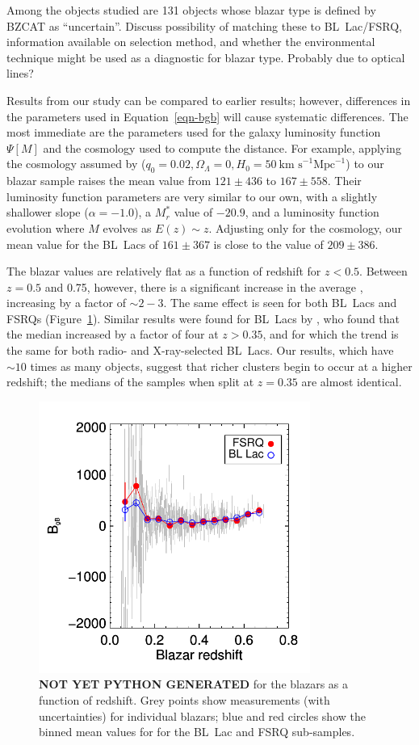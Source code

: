 \documentclass{emulateapj}
\begin{document}
Among the objects studied are 131 objects whose blazar type is defined by BZCAT as ``uncertain''. Discuss possibility of matching these to BL~Lac/FSRQ, information available on selection method, and whether the environmental technique might be used as a diagnostic for blazar type. Probably due to optical lines?

Results from our study can be compared to earlier results; however, differences in the parameters used in Equation~\ref{eqn-bgb} will cause systematic differences. The most immediate are the parameters used for the galaxy luminosity function $\Psi[M]$ and the cosmology used to compute the distance. For example, applying the cosmology assumed by \citet{wur97} ($q_0=0.02, \Omega_\Lambda=0, H_0=50~\mbox{km s}^{-1}\mbox{Mpc}^{-1}$) to our blazar sample raises the mean \bgb{} value from $121\pm436$ to $167\pm558$. Their luminosity function parameters are very similar to our own, with a slightly shallower slope ($\alpha=-1.0$), a $M_r^*$ value of $-20.9$, and a luminosity function evolution where $M$ evolves as $E(z)\sim z$. Adjusting only for the cosmology, our mean value for the BL~Lacs of $161\pm367$ is close to the \citet{wur97} value of $209\pm386$. 

The blazar \bgb{} values are relatively flat as a function of redshift for $z<0.5$. Between $z=0.5$ and 0.75, however, there is a significant increase in the average \bgb, increasing by a factor of $\sim2-3$. The same effect is seen for both BL~Lacs and FSRQs (Figure~\ref{fig-bgb_redshift}). Similar results were found for BL~Lacs by \citet{wur97}, who found that the median \bgb{} increased by a factor of four at $z>0.35$, and for which the trend is the same for both radio- and X-ray-selected BL~Lacs. Our results, which have $\sim10$ times as many objects, suggest that richer clusters begin to occur at a higher redshift; the medians of the samples when split at $z=0.35$ are almost identical. 

\begin{figure}
\includegraphics[width=3.5in]{figures/bgb_redshift.pdf}
\caption{{\bf NOT YET PYTHON GENERATED} \bgb{} for the blazars as a function of redshift. Grey points show measurements (with uncertainties) for individual blazars; blue and red circles show the binned mean values for \bgb{} for the BL~Lac and FSRQ sub-samples. 
\label{fig-bgb_redshift}}
\end{figure}
\end{document}

